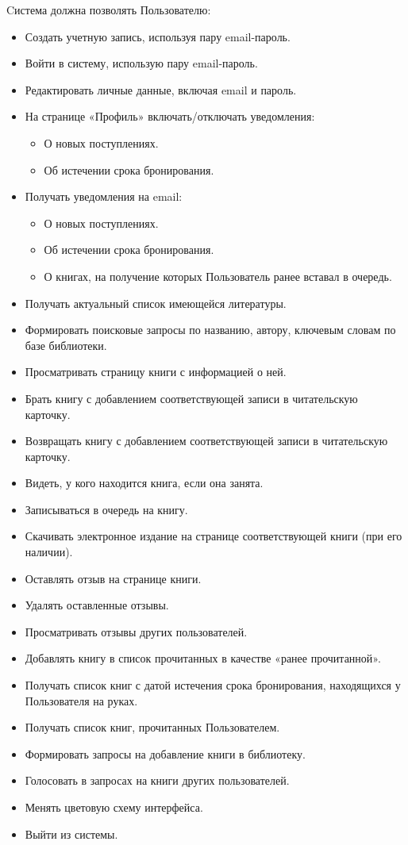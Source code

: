 \documentclass[../Отчет.tex]{subfiles}
\begin{document}
\par
Cистема должна позволять Пользователю:
\begin{itemize}
    \item Создать учетную запись, используя пару email-пароль.
    \item Войти в систему, использую пару email-пароль.
    \item Редактировать личные данные, включая email и пароль.
    \item На странице «Профиль» включать/отключать уведомления:
    \begin{itemize}
        \item О новых поступлениях.
        \item Об истечении срока бронирования.
    \end{itemize}
    \item Получать уведомления на email:
    \begin{itemize}
        \item О новых поступлениях.
        \item Об истечении срока бронирования.
        \item О книгах, на получение которых Пользователь ранее вставал в очередь.
    \end{itemize}
    \item Получать актуальный список имеющейся литературы.
    \item Формировать поисковые запросы по названию, автору, ключевым словам по базе библиотеки.
    \item Просматривать страницу книги с информацией о ней.
    \item Брать книгу с добавлением соответствующей записи в читательскую карточку.
    \item Возвращать книгу с добавлением соответствующей записи в читательскую карточку.
    \item Видеть, у кого находится книга, если она занята.
    \item Записываться в очередь на книгу.
    \item Скачивать электронное издание на странице соответствующей книги (при его наличии).
    \item Оставлять отзыв на странице книги.
    \item Удалять оставленные отзывы.
    \item Просматривать отзывы других пользователей.
    \item Добавлять книгу в список прочитанных в качестве «ранее прочитанной».
    \item Получать список книг с датой истечения срока бронирования, находящихся у Пользователя на руках.
    \item Получать список книг, прочитанных Пользователем. 
    \item Формировать запросы на добавление книги в библиотеку.
    \item Голосовать в запросах на книги других пользователей.
    \item Менять цветовую схему интерфейса.
    \item Выйти из системы.
\end{itemize}
\end{document}
